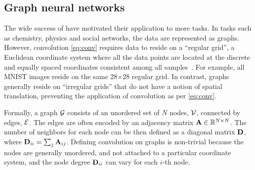 
\subsection{Graph neural networks\label{sec:bg_gnn}}

The wide success of \cnns have motivated their application to more tasks.
In tasks such as chemistry, physics and social networks,
the data are represented as graphs. 
However, convolution \eqref{eq:conv} requires data to reside on a ``regular grid'', a Euclidean coordinate system where all the data points are located at the discrete and equally spaced coordinates consistent among all samples~\citep{bronstein2017geometric}. For example, all MNIST images reside on the same 28$\times$28 regular grid. In contrast, graphs generally reside on ``irregular grids'' that do not have a notion of spatial translation, preventing the application of convolution as per \eqref{eq:conv}.

Formally, a graph $\mathcal{G}$ consists of an unordered set of $N$ nodes, $\mathcal{V}$, connected by edges, $\mathcal{E}$. 
The edges are often encoded by an adjacency matrix $\mathbf{A} \in \mathbb{R}^{N \times N}$. The number of neighbors for each node can be then defined as a diagonal matrix $\mathbf{D}$, where $\mathbf{D}_{ii} = \sum_j \mathbf{A}_{ij}$. %
Defining convolution on graphs is non-trivial because the nodes are generally unordered, and not attached to a particular coordinate system, and the node degree $\mathbf{D}_{ii}$ can vary for each $i$-th node.

